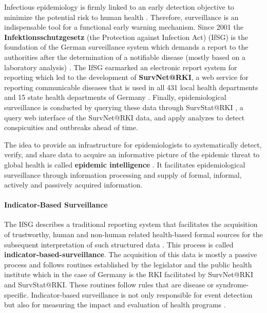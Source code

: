 Infectious epidemiology is firmly linked to an early detection objective to minimize the potential risk to human health \citep{EarlyDetection}.
Therefore, surveillance is an indispensable tool for a functional early warning mechanism.
Since 2001 the \textbf{Infektionsschutzgesetz} (the Protection against Infection Act) (\gls{IfSG})
is the foundation of the German surveillance system which demands a report to the authorities after the determination of a notifiable disease (mostly based on a laboratory analysis) \citep{IfSG}.
The IfSG earmarked an electronic report system for reporting which led to the development of \textbf{SurvNet@RKI}, a web service for reporting communicable diseases that is used in all 431 local health departments and 15 state health departments of Germany \citep{Faensen2006}.
Finally, epidemiological surveillance is conducted by querying these data through SurvStat@RKI \citep{Faensen2004}, a query web interface of the SurvNet@RKI data, and apply analyzes to detect conspicuities and outbreaks ahead of time.

The idea to provide an infrastructure for epidemiologists to systematically detect, verify, and share data to acquire an informative picture of the epidemic threat to global health is called \textbf{epidemic intelligence} \citep{EarlyDetection}. It facilitates epidemiological surveillance through information processing and supply of formal, informal, actively and passively acquired information.

\paragraph{Indicator-Based Surveillance}
The IfSG describes a traditional reporting system that facilitates the acquisition of trustworthy, human and non-human related health-based formal sources for the subsequent interpretation of such structured data \citep{EarlyDetection}. This process is called \textbf{indicator-based-surveillance}.
The acquisition of this data is mostly a passive process and follows routines established by the legislator and the public health institute which in the case of Germany is the RKI facilitated by SurvNet@RKI and SurvStat@RKI.
These routines follow rules that are disease or syndrome-specific.
Indicator-based surveillance is not only responsible for event detection but also for measuring the impact and evaluation of health programs \citep{EarlyDetection}.

